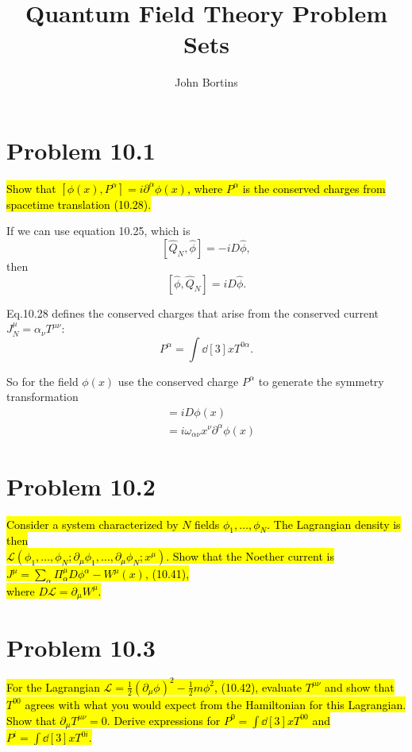 \documentclass{article}
\title{Quantum Field Theory Problem Sets}
\author{John Bortins}
\begin{document}
\maketitle{}

\section*{Problem 10.1}
\begin{quoting}
    \hl{Show that $[\phi(x),P^\alpha]=i\partial^\alpha \phi(x)$, where $P^\alpha$ is the conserved charges from spacetime translation (10.28).}
\end{quoting}


If we can use equation 10.25, which is \[[\hat{Q}_{N},\hat{\phi}]=-iD\hat{\phi},\] then \[[\hat{\phi},\hat{Q}_{N}]=iD\hat{\phi}.\]

Eq.10.28 defines the conserved charges that arise from the conserved current $J_N^\mu=\alpha_\nu T^{\mu\nu}$: \[P^\alpha=\int \dd[3]{x}T^{0\alpha} .\]

So for the field $\phi(x)$ use the conserved charge $P^\alpha$ to generate the symmetry transformation
\begin{align*}
    [\phi(x),P^\alpha] & =iD\phi(x)                                         \\
                       & =i\omega_{\alpha\nu} x^\nu \partial^\alpha \phi(x)
\end{align*}



\section*{Problem 10.2}
\begin{quoting}
    \hl{Consider a system characterized by $N$ fields $\phi_1,\dots,\phi_N$. The Lagrangian density is then\\ $\mathcal{L}(\phi_1,\dots,\phi_N;\partial_\mu \phi_1,\dots,\partial_\mu \phi_N;x^\mu)$. Show that the Noether current is $J^\mu=\sum_\alpha \Pi_\alpha^\mu  D\phi^\alpha-W^\mu(x)$, (10.41),\\ where $D\mathcal{L}=\partial_\mu W^\mu$.}
\end{quoting}


\section*{Problem 10.3}
\begin{quoting}
    \hl{For the Lagrangian $\mathcal{L}=\frac{1}{2}(\partial_\mu \phi)^2-\frac{1}{2}m\phi^2$, (10.42), evaluate $T^{\mu\nu}$ and show that $T^{00}$ agrees with what you would expect from the Hamiltonian for this Lagrangian. Show that $\partial_\mu T^{\mu\nu}=0$. Derive expressions for $P^0=\int\dd[3]{x}T^{00}$ and $P^i=\int\dd[3]{x}T^{0i}$.}
\end{quoting}
\end{document}
